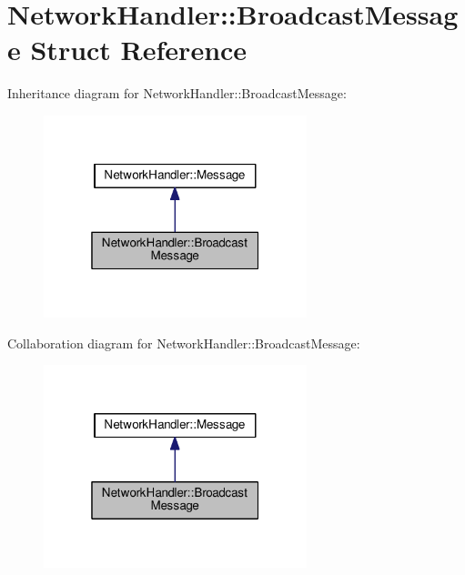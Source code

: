 \hypertarget{structNetworkHandler_1_1BroadcastMessage}{}\section{Network\+Handler\+:\+:Broadcast\+Message Struct Reference}
\label{structNetworkHandler_1_1BroadcastMessage}


Inheritance diagram for Network\+Handler\+:\+:Broadcast\+Message\+:\nopagebreak
\begin{figure}[H]
\begin{center}
\leavevmode
\includegraphics[width=217pt]{structNetworkHandler_1_1BroadcastMessage__inherit__graph}
\end{center}
\end{figure}


Collaboration diagram for Network\+Handler\+:\+:Broadcast\+Message\+:\nopagebreak
\begin{figure}[H]
\begin{center}
\leavevmode
\includegraphics[width=217pt]{structNetworkHandler_1_1BroadcastMessage__coll__graph}
\end{center}
\end{figure}
